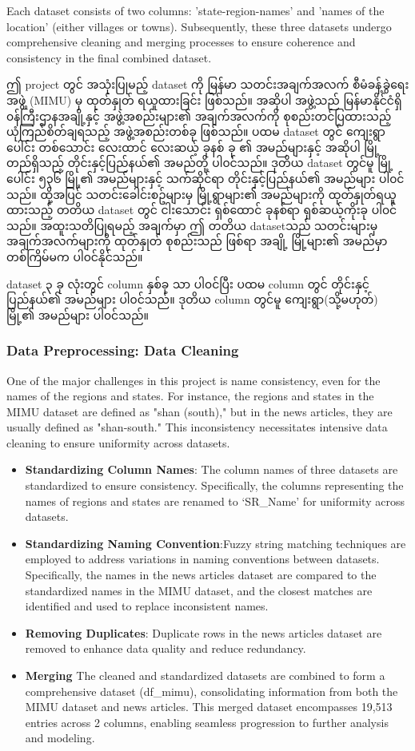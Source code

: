 Each dataset consists of two columns: 'state-region-names' and 'names of the location' (either villages or towns). Subsequently, these three datasets undergo comprehensive cleaning and merging processes to ensure coherence and consistency in the final combined dataset.

ဤ project တွင် အသုံးပြုမည့် dataset ကို မြန်မာ သတင်းအချက်အလက် စီမံခန့်ခွဲရေးအဖွဲ့ (MIMU) မှ ထုတ်နှုတ် ရယူထားခြင်း ဖြစ်သည်။ အဆိုပါ အဖွဲ့သည် မြန်မာနိုင်ငံရှိ ၀န်ကြီးဌာနအချို့နှင့် အဖွဲ့အစည်းများ၏ အချက်အလက်ကို စုစည်းတင်ပြထားသည့် ယုံကြည်စိတ်ချရသည့် အဖွဲ့အစည်းတစ်ခု ဖြစ်သည်။ ပထမ dataset တွင် ကျေးရွာပေါင်း  တစ်သောင်း လေးထာင် လေးဆယ့် ခုနစ် ခု ၏ အမည်များနှင့် အဆိုပါ မြို့ တည်ရှိသည့် တိုင်းနှင့်ပြည်နယ်၏ အမည်တို့ ပါ၀င်သည်။ ဒုတိယ dataset တွင်မူ မြို့ပေါင်း ၅၃၆ မြို့၏ အမည်များနှင့် သက်ဆိုင်ရာ တိုင်းနှင့်ပြည်နယ်၏ အမည်များ ပါ၀င်သည်။ ထို့အပြင် သတင်းခေါင်းစဥ်များမှ မြို့ရွာများ၏ အမည်များကို ထုတ်နှုတ်ရယူထားသည့် တတိယ dataset တွင် ငါးသောင်း ရှစ်ထောင် ခုနစ်ရာ ရှစ်ဆယ့်ကိုးခု ပါ၀င်သည်။ အထူးသတိပြုရမည့် အချက်မှာ ဤ တတိယ datasetသည် သတင်းများမှ အချက်အလက်များကို ထုတ်နှုတ် စုစည်းသည် ဖြစ်ရာ အချို့ မြို့များ၏ အမည်မှာ တစ်ကြိမ်မက ပါ၀င်နိုင်သည်။ 

dataset ၃ ခု လုံးတွင် column နှစ်ခု သာ ပါ၀င်ပြီး ပထမ column တွင် တိုင်းနှင့် ပြည်နယ်၏ အမည်များ ပါ၀င်သည်။ ဒုတိယ column တွင်မူ ကျေးရွာ(သို့မဟုတ်) မြို့၏ အမည်များ ပါ၀င်သည်။ 

\subsubsection{Data Preprocessing: Data Cleaning}
One of the major challenges in this project is name consistency, even for the names of the regions and states. For instance, the regions and states in the MIMU dataset are defined as "shan (south)," but in the news articles, they are usually defined as "shan-south." This inconsistency necessitates intensive data cleaning to ensure uniformity across datasets.

\begin{itemize}
  \item \textbf{Standardizing Column Names}: The column names of three datasets are standardized to ensure consistency. Specifically, the columns representing the names of regions and states are renamed to `SR\_Name' for uniformity across datasets.
  \item \textbf{Standardizing Naming Convention}:Fuzzy string matching techniques are employed to address variations in naming conventions between datasets. Specifically, the names in the news articles dataset are compared to the standardized names in the MIMU dataset, and the closest matches are identified and used to replace inconsistent names.
  \item \textbf{Removing Duplicates}: Duplicate rows in the news articles dataset are removed to enhance data quality and reduce redundancy.
  \item \textbf{Merging} The cleaned and standardized datasets are combined to form a comprehensive dataset (df\_mimu), consolidating information from both the MIMU dataset and news articles. This merged dataset encompasses 19,513 entries across 2 columns, enabling seamless progression to further analysis and modeling.
\end{itemize}

